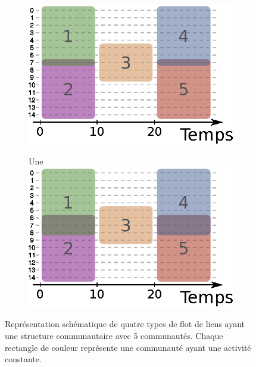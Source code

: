 \begin{figure}
	\begin{subfigure}{0.3\textwidth}
		\includegraphics[width=\textwidth]{img/Qualite/topologie3.eps}
		\caption{}
		\label{fig:versqualite_gen_test3}
	\end{subfigure}\hspace*{0.1\textwidth}
	\begin{subfigure}{0.3\textwidth}Une
		\includegraphics[width=\textwidth]{img/Qualite/topologie4.eps}
		\caption{}
		\label{fig:versqualite_gen_test4}
	\end{subfigure}	
	\caption{Représentation schématique de quatre types de flot de liens ayant une structure communautaire avec 5 communautés.
	Chaque rectangle de couleur représente une communauté ayant une activité constante.}
	\label{fig:versqualite_gen_test}
\end{figure}

